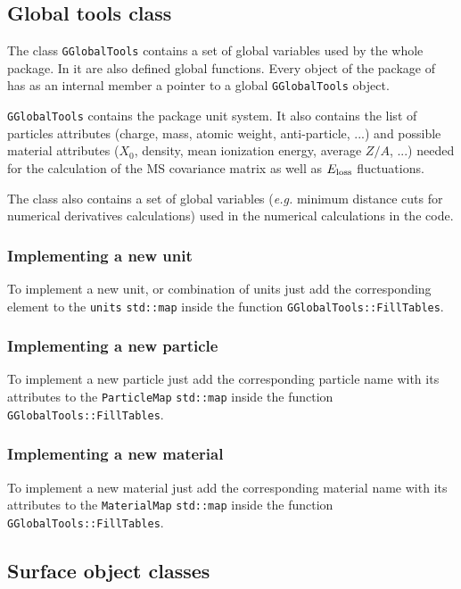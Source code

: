 \subsection{Global tools class}
\label{subsec:global_tools}

The class {\tt GGlobalTools} contains a set of global variables used by the whole package. In it are also defined global functions. Every object of the 
package of has as an internal member a pointer to a global {\tt GGlobalTools} object.

{\tt GGlobalTools} contains the {\guari} package unit system. It also contains the list of particles attributes (charge, mass, atomic weight, anti-particle, ...) 
and possible material attributes ($X_0$, density, mean ionization energy, average $Z/A$, ...) needed for the calculation of the MS covariance matrix as well as $E_{\rm loss}$ 
fluctuations.

The class also contains a set of global variables ({\it e.g.} minimum distance cuts for numerical derivatives calculations) used in the 
numerical calculations in the code.

\subsubsection{Implementing a new unit}

To implement a new unit, or combination of units just add the corresponding element to the {\tt units} {\tt std::map} inside the function {\tt GGlobalTools::FillTables}.

\subsubsection{Implementing a new particle}

To implement a new particle just add the corresponding particle name with its attributes to the {\tt ParticleMap} {\tt std::map} inside the function {\tt GGlobalTools::FillTables}.

\subsubsection{Implementing a new material}

To implement a new material just add the corresponding material name with its attributes to the {\tt MaterialMap} {\tt std::map} inside the function {\tt GGlobalTools::FillTables}.

\subsection{Surface object classes}
\label{subsec:Surf_class}

